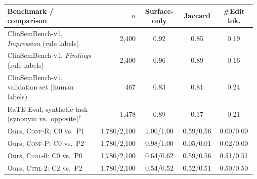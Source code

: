 \begin{tabular}{lrccc}
\toprule
\textbf{Benchmark / comparison} & \textbf{$n$} & \textbf{Surface-only} & \textbf{Jaccard} & \textbf{\#Edit tok.} \\
\midrule
ClinSemBench-v1, \textit{Impression} (rule labels) & 2,400 & 0.92 & 0.85 & 0.19 \\
ClinSemBench-v1, \textit{Findings} (rule labels) & 2,400 & 0.96 & 0.89 & 0.16 \\
ClinSemBench-v1, validation set (human labels) & 467 & 0.83 & 0.81 & 0.24 \\
RaTE-Eval, synthetic task (synonym vs.\ opposite)$^{\dagger}$ & 1,478 & 0.89 & 0.17 & 0.21 \\
\midrule
Ours, \textsc{Conf-R}: C0 vs.\ P1 & 1,780/2,100 & 1.00/1.00 & 0.59/0.56 & 0.00/0.00 \\
Ours, \textsc{Conf-P}: C0 vs.\ P2 & 1,780/2,100 & 0.98/1.00 & 0.05/0.01 & 0.02/0.00 \\
Ours, \textsc{Ctrl-0}: C0 vs.\ P0 & 1,780/2,100 & 0.64/0.62 & 0.59/0.56 & 0.51/0.51 \\
Ours, \textsc{Ctrl-2}: C2 vs.\ P2 & 1,780/2,100 & 0.54/0.52 & 0.52/0.51 & 0.50/0.50 \\
\bottomrule
\end{tabular}